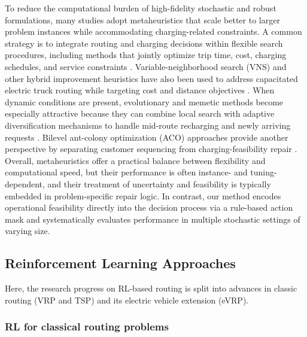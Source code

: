 \documentclass[a4paper,fleqn]{cas-sc}
\begin{document}
To reduce the computational burden of high-fidelity stochastic and robust formulations, many studies adopt metaheuristics that scale better to larger problem instances while accommodating charging-related constraints. A common strategy is to integrate routing and charging decisions within flexible search procedures, including methods that jointly optimize trip time, cost, charging schedules, and service constraints \citep{https://doi.org/10.1049/pel2.12555}. Variable-neighborhood search (VNS) and other hybrid improvement heuristics have also been used to address capacitated electric truck routing while targeting cost and distance objectives \citep{euchi_hybrid_2023}. When dynamic conditions are present, evolutionary and memetic methods become especially attractive because they can combine local search with adaptive diversification mechanisms to handle mid-route recharging and newly arriving requests \citep{dong_dynamic_2023,https://doi.org/10.1155/2021/6635749}. Bilevel ant-colony optimization (ACO) approaches provide another perspective by separating customer sequencing from charging-feasibility repair \citep{9409782}. 
Overall, metaheuristics offer a practical balance between flexibility and computational speed, but their performance is often instance- and tuning-dependent, and their treatment of uncertainty and feasibility is typically embedded in problem-specific repair logic. In contrast, our method encodes operational feasibility directly into the decision process via a rule-based action mask and systematically evaluates performance in multiple stochastic settings of varying size.

\subsection{Reinforcement Learning Approaches}

Here, the research progress on RL-based routing is split into advances in classic routing (VRP and TSP) and its electric vehicle extension (eVRP).

\subsubsection{RL for classical routing problems}
\end{document}
